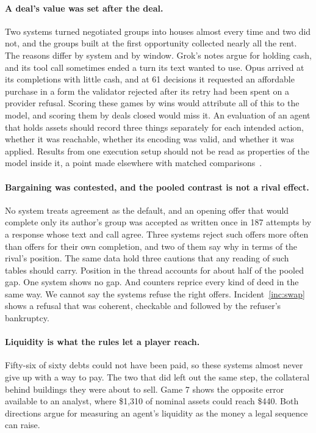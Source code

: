\paragraph{A deal's value was set after the deal.} Two systems turned negotiated groups into houses almost every time and two did not, and the groups built at the first opportunity collected nearly all the rent. The reasons differ by system and by window. Grok's notes argue for holding cash, and its tool call sometimes ended a turn its text wanted to use. Opus arrived at its completions with little cash, and at 61 decisions it requested an affordable purchase in a form the validator rejected after its retry had been spent on a provider refusal. Scoring these games by wins would attribute all of this to the model, and scoring them by deals closed would miss it. An evaluation of an agent that holds assets should record three things separately for each intended action, whether it was reachable, whether its encoding was valid, and whether it was applied. Results from one execution setup should not be read as properties of the model inside it, a point made elsewhere with matched comparisons~\cite{zhang2026dece,hardy2026reliability}.

\paragraph{Bargaining was contested, and the pooled contrast is not a rival effect.} No system treats agreement as the default, and an opening offer that would complete only its author's group was accepted as written once in 187 attempts by a response whose text and call agree. Three systems reject such offers more often than offers for their own completion, and two of them say why in terms of the rival's position. The same data hold three cautions that any reading of such tables should carry. Position in the thread accounts for about half of the pooled gap. One system shows no gap. And counters reprice every kind of deed in the same way. We cannot say the systems refuse the right offers. Incident~\ref{inc:swap} shows a refusal that was coherent, checkable and followed by the refuser's bankruptcy.

\paragraph{Liquidity is what the rules let a player reach.} Fifty-six of sixty debts could not have been paid, so these systems almost never give up with a way to pay. The two that did left out the same step, the collateral behind buildings they were about to sell. Game 7 shows the opposite error available to an analyst, where \$1,310 of nominal assets could reach \$440. Both directions argue for measuring an agent's liquidity as the money a legal sequence can raise.

